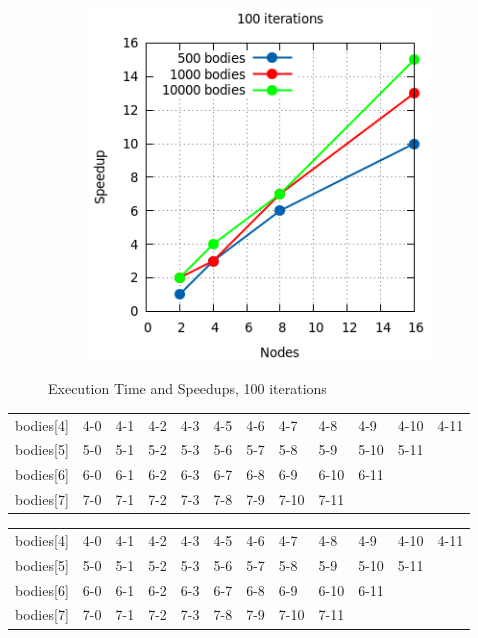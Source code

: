 \documentclass[a4paper]{article}
\begin{document}
\begin{figure}[ht]
\begin{subfigure}{.5\textwidth}
\end{subfigure} %
\begin{subfigure}{.5\textwidth}
  \centering
  \includegraphics[width=1\linewidth]{results/100_sp}
\end{subfigure} 
  \caption{Execution Time and Speedups, 100 iterations}
  \label{fig:R2}
\end{figure}
\FloatBarrier

\begin{minipage}[b]{.40\textwidth}
  \centering
  \begin{tabular}{llllllllllll}
bodies{[}4{]} & 4-0 & 4-1 & 4-2 & 4-3 & 4-5 & 4-6 & 4-7  & 4-8  & 4-9  & 4-10 & 4-11 \\
bodies{[}5{]} & 5-0 & 5-1 & 5-2 & 5-3 & 5-6 & 5-7 & 5-8  & 5-9  & 5-10 & 5-11 &      \\
bodies{[}6{]} & 6-0 & 6-1 & 6-2 & 6-3 & 6-7 & 6-8 & 6-9  & 6-10 & 6-11 &      &      \\
bodies{[}7{]} & 7-0 & 7-1 & 7-2 & 7-3 & 7-8 & 7-9 & 7-10 & 7-11 &      &      &     
\end{tabular}
  \label{tab:R2_t1}
\end{minipage} \qquad
\begin{minipage}[b]{.40\textwidth}
  \centering
  \begin{tabular}{llllllllllll}
bodies{[}4{]} & 4-0 & 4-1 & 4-2 & 4-3 & 4-5 & 4-6 & 4-7  & 4-8  & 4-9  & 4-10 & 4-11 \\
bodies{[}5{]} & 5-0 & 5-1 & 5-2 & 5-3 & 5-6 & 5-7 & 5-8  & 5-9  & 5-10 & 5-11 &      \\
bodies{[}6{]} & 6-0 & 6-1 & 6-2 & 6-3 & 6-7 & 6-8 & 6-9  & 6-10 & 6-11 &      &      \\
bodies{[}7{]} & 7-0 & 7-1 & 7-2 & 7-3 & 7-8 & 7-9 & 7-10 & 7-11 &      &      &     
\end{tabular}
  \label{tab:R2_t2}
\end{minipage}	
\end{document}
